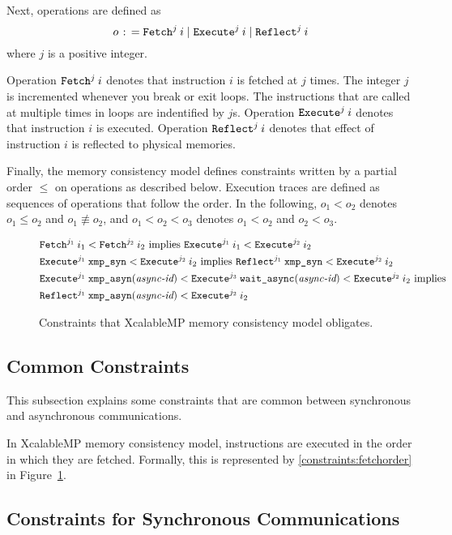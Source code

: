 Next, operations are defined as
\[
o \mathrel{\colon\!=} \texttt{Fetch}^{j} \: {i} \mid \texttt{Execute}^{j} \: {i} \mid \texttt{Reflect}^{j} \: {i}
\]
where $j$ is a positive integer.

Operation $\texttt{Fetch}^{j} \: {i}$ denotes that instruction $i$ is fetched at $j$
times.  The integer $j$ is incremented whenever you break or exit
loops.  The instructions that are called at multiple times in loops
are indentified by $j$s.  Operation $\texttt{Execute}^{j} \: {i}$ denotes that
instruction $i$ is executed.  Operation $\texttt{Reflect}^{j} \: {i}$ denotes that effect
of instruction $i$ is reflected to physical memories.

Finally, the memory consistency model defines constraints written by a
partial order $\leq$ on operations as described below.  Execution
traces are defined as sequences of operations that follow the order.
In the following, $o_1 < o_2$ denotes $o_1 \leq o_2$ and $o_1
\not\equiv o_2$, and $o_1 < o_2 < o_3$ denotes $o_1 < o_2$ and $o_2 <
o_3$.

{
\renewcommand{\theequation}{\roman{equation}}
\begin{figure}[htbp]
\begin{align}
& \texttt{Fetch}^{j_1} \: {i_1} < \texttt{Fetch}^{j_2} \: {i_2} \mbox{ implies } \texttt{Execute}^{j_1} \: {i_1} < \texttt{Execute}^{j_2} \: {i_2} \label{constraints:fetchorder}\\
& \texttt{Execute}^{j_1} \: {\texttt{xmp\_syn}} < \texttt{Execute}^{j_2} \: {i_2} \mbox{ implies } \texttt{Reflect}^{j_1} \: {\texttt{xmp\_syn}} < \texttt{Execute}^{j_2} \: {i_2} \label{constraints:synchronous}\\
& \texttt{Execute}^{j_1} \: {\texttt{xmp\_asyn}(\textit{async-id})} < \texttt{Execute}^{j_3} \: {\texttt{wait\_async}(\textit{async-id})} < \texttt{Execute}^{j_2} \: {i_2} \mbox{ implies} \nonumber\\
& \texttt{Reflect}^{j_1} \: {\texttt{xmp\_asyn}(\textit{async-id})} < \texttt{Execute}^{j_2} \: {i_2} \label{constraints:asynchronous}
\end{align}
\caption{Constraints that XcalableMP memory consistency model obligates.}\label{fig:constraints}
\end{figure}
}

\subsection{Common Constraints}

This subsection explains some constraints that are common between
synchronous and asynchronous communications.

In XcalableMP memory consistency model, instructions are executed in
the order in which they are fetched.  Formally, this is represented by
\ref{constraints:fetchorder} in Figure~\ref{fig:constraints}.

\subsection{Constraints for Synchronous Communications}

